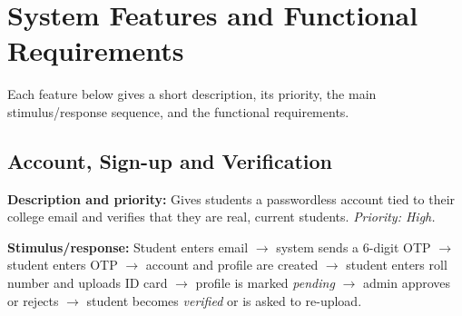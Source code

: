 \documentclass[11pt,a4paper]{scrreprt}
\begin{document}
\chapter{System Features and Functional Requirements}

Each feature below gives a short description, its priority, the main
stimulus/response sequence, and the functional requirements.

\section{Account, Sign-up and Verification}
\textbf{Description and priority:} Gives students a passwordless account
tied to their college email and verifies that they are real, current
students. \emph{Priority: High.}

\noindent\textbf{Stimulus/response:} Student enters email $\rightarrow$ system sends a
6-digit OTP $\rightarrow$ student enters OTP $\rightarrow$ account and profile
are created $\rightarrow$ student enters roll number and uploads ID card
$\rightarrow$ profile is marked \emph{pending} $\rightarrow$ admin approves or
rejects $\rightarrow$ student becomes \emph{verified} or is asked to re-upload.
\end{document}

